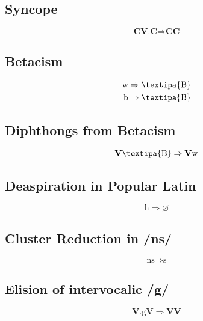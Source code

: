 \documentclass{report}
\begin{document}
\subsection{Syncope}

\begin{equation}
  \textbf{CV.C} \Rightarrow \textbf{CC}
\end{equation}

\subsection{Betacism}

\begin{align}
\text{w} & \Rightarrow \text{\textipa{B}} \\
\text{b} & \Rightarrow \text{\textipa{B}}
\end{align}

\subsection{Diphthongs from Betacism}

\begin{equation}
\textbf{V}\text{\textipa{B}} \Rightarrow \textbf{V}\text{w}
\end{equation}

\subsection{Deaspiration in Popular Latin}

\begin{equation}
  \text{h} \Rightarrow \varnothing
\end{equation}

\subsection{Cluster Reduction in /ns/}

\begin{equation}
  \text{ns} \Rightarrow \text{s}
\end{equation}

\subsection{Elision of intervocalic /g/}

\begin{equation}
  \textbf{V}.\text{g}\textbf{V} \Rightarrow \textbf{VV}
\end{equation}
\end{document}
